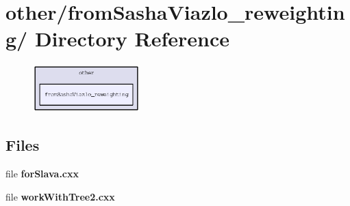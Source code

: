 \section{other/from\-Sasha\-Viazlo\_\-reweighting/ Directory Reference}
\label{dir_f5681d8adad036d49a0592ea2a81afc0}


\begin{figure}[H]
\begin{center}
\leavevmode
\includegraphics[width=117pt]{dir_f5681d8adad036d49a0592ea2a81afc0_dep}
\end{center}
\end{figure}
\subsection*{Files}
\begin{CompactItemize}
\item 
file \textbf{for\-Slava.cxx}
\item 
file \textbf{work\-With\-Tree2.cxx}
\end{CompactItemize}
